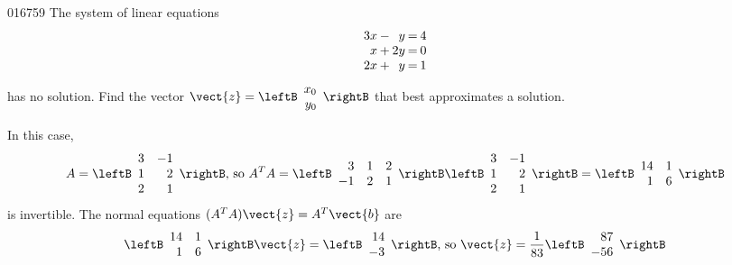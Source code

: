 \begin{example}{}{016759}
The system of linear equations
\begin{equation*}
\arraycolsep=1pt
\begin{array}{rlrcr}
	3x & - &  y & = & 4 \\
 	 x & + & 2y & = & 0 \\
 	2x & + &  y & = & 1
\end{array}
\end{equation*}
has no solution. Find the vector 
$ \vect{z} = 
\leftB \begin{array}{r}
x_0 \\
y_0
\end{array} \rightB$ that best approximates a solution.

\begin{solution}
In this case,
\begin{equation*}
A = \leftB \begin{array}{rr}
3 & -1 \\
1 & 2 \\
2 & 1
\end{array} \rightB
\mbox{, so }
A^TA = \leftB \begin{array}{rrr}
3 & 1 & 2 \\
-1 & 2 & 1
\end{array} \rightB
\leftB \begin{array}{rr}
3 & -1 \\
1 & 2 \\
2 & 1
\end{array} \rightB
= \leftB \begin{array}{rr}
14 & 1 \\
 1 & 6
\end{array} \rightB
\end{equation*}
is invertible. The normal equations $(A^{T}A)\vect{z} = A^{T}\vect{b}$ are
\begin{equation*}
\leftB \begin{array}{rr}
14 & 1 \\
1 & 6
\end{array} \rightB
\vect{z} = 
\leftB \begin{array}{r}
14 \\
-3
\end{array} \rightB
\mbox{, so }
\vect{z} = \frac{1}{83}
\leftB \begin{array}{r}
87 \\
-56
\end{array} \rightB
\end{equation*}

\end{solution}
\end{example}
